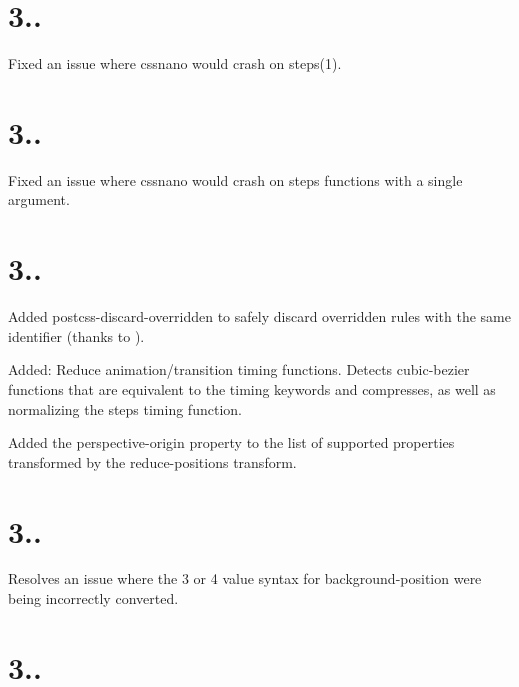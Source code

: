 \section*{3..}


\begin{DoxyItemize}
\item Fixed an issue where cssnano would crash on {\ttfamily steps(1)}.
\end{DoxyItemize}

\section*{3..}


\begin{DoxyItemize}
\item Fixed an issue where cssnano would crash on {\ttfamily steps} functions with a single argument.
\end{DoxyItemize}

\section*{3..}


\begin{DoxyItemize}
\item Added {\ttfamily postcss-\/discard-\/overridden} to safely discard overridden rules with the same identifier (thanks to ).
\item Added\+: Reduce animation/transition timing functions. Detects {\ttfamily cubic-\/bezier} functions that are equivalent to the timing keywords and compresses, as well as normalizing the {\ttfamily steps} timing function.
\item Added the {\ttfamily perspective-\/origin} property to the list of supported properties transformed by the {\ttfamily reduce-\/positions} transform.
\end{DoxyItemize}

\section*{3..}


\begin{DoxyItemize}
\item Resolves an issue where the 3 or 4 value syntax for {\ttfamily background-\/position} were being incorrectly converted.
\end{DoxyItemize}

\section*{3..}


